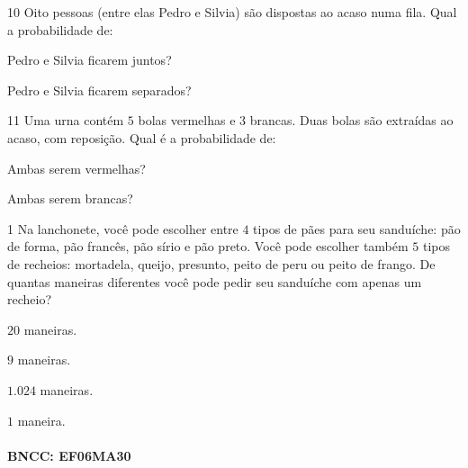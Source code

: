 \num{10} Oito pessoas (entre elas Pedro e Silvia) são dispostas ao acaso numa
fila. Qual a probabilidade de:

\begin{escolha}
\item Pedro e Silvia ficarem juntos? 
\item Pedro e Silvia ficarem separados? 
\end{escolha}

\num{11} Uma urna contém $5$ bolas vermelhas e $3$ brancas. Duas bolas são
extraídas ao acaso, com reposição. Qual é a probabilidade de:

\begin{escolha}
\item Ambas serem vermelhas? 
\item Ambas serem brancas? 
\end{escolha}


\num{1}  Na lanchonete, você pode escolher entre $4$ tipos de pães para seu
sanduíche: pão de forma, pão francês, pão sírio e pão preto. Você pode
escolher também $5$ tipos de recheios: mortadela, queijo, presunto, peito
de peru ou peito de frango. De quantas maneiras diferentes você pode
pedir seu sanduíche com apenas um recheio?

\begin{escolha}
\item $20$ maneiras.
\item $9$ maneiras.
\item $1.024$ maneiras.
\item $1$ maneira.
\end{escolha}

\paragraph{BNCC: EF06MA30 }


